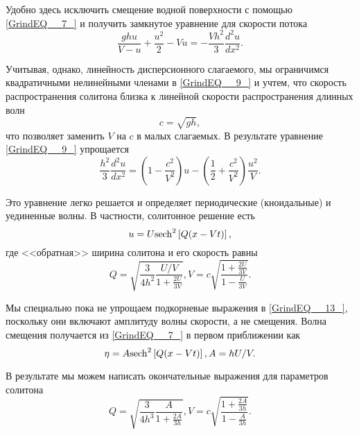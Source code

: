 Удобно здесь исключить смещение водной поверхности с помощью \eqref{GrindEQ__7_} и получить замкнутое уравнение для скорости потока
\begin{equation} \label{GrindEQ__9_}
\frac{ghu}{V-u} +\frac{u^{2} }{2} -Vu=-\frac{Vh^{2} }{3} \frac{d^{2} u}{dx^{2} } .
\end{equation}

Учитывая, однако, линейность дисперсионного слагаемого, мы ограничимся квадратичными нелинейными членами в \eqref{GrindEQ__9_} и учтем, что скорость распространения солитона близка к линейной скорости распространения длинных волн
\begin{equation} \label{GrindEQ__10_}
c=\sqrt{gh} ,
\end{equation}
что позволяет заменить $V$ на $c$ в малых слагаемых. В результате уравнение \eqref{GrindEQ__9_} упрощается
\begin{equation} \label{GrindEQ__11_}
\frac{h^{2} }{3} \frac{d^{2} u}{dx^{2} } =\left(1-\frac{c^{2} }{V^{2} } \right)u-\left(\frac{1}{2} +\frac{c^{2} }{V^{2} } \right)\frac{u^{2} }{V} .
\end{equation}

Это уравнение легко решается и определяет периодические (кноидальные) и уединенные волны. В частности, солитонное решение есть
\begin{equation} \label{GrindEQ__12_}
u=U{\rm sech}^{2} \left[Q(x-Vt)\right],
\end{equation}
где <<обратная>> ширина солитона и его скорость равны
\begin{equation} \label{GrindEQ__13_}
Q=\sqrt{\frac{3}{4h^{2} } \frac{U/V}{1+\frac{2U}{3V} } } ,        V=c\sqrt{\frac{1+\frac{2U}{3V} }{1-\frac{U}{3V} } } .
\end{equation}


 Мы специально пока не упрощаем подкорневые выражения в \eqref{GrindEQ__13_}, поскольку они включают амплитуду волны скорости, а не смещения. Волна смещения получается из \eqref{GrindEQ__7_} в первом приближении как
\begin{equation} \label{GrindEQ__14_}
\eta =A{\rm sech}^{2} \left[Q(x-Vt)\right],               A=hU/V.
\end{equation}

В результате мы можем написать окончательные выражения для параметров солитона
\begin{equation} \label{GrindEQ__15_}
Q=\sqrt{\frac{3}{4h^{3} } \frac{A}{1+\frac{2A}{3h} } } ,        V=c\sqrt{\frac{1+\frac{2A}{3h} }{1-\frac{A}{3h} } } .
\end{equation}

